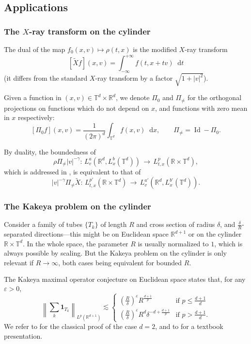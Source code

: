 \documentclass[11pt,a4paper,reqno]{amsart}
\theoremstyle{plain}
\theoremstyle{remark}
\newcommand{\dd}{\mathop{}\!\mathrm{d}}
\begin{document}
\subsection{Applications}

\subsubsection{The $X$-ray transform on the cylinder} The dual of the map $f_0(x,v) \mapsto \rho(t,x)$ is the modified $X$-ray transform
\[
    [\widetilde{X} f](x,v) = \int_{-\infty}^{+ \infty} f(t,x+tv) \dd t
\]
(it differs from the standard $X$-ray transform by a factor $\sqrt{1+|v|^2}$).

Given a function in $(x,v) \in \mathbb{T}^d \times \mathbb{R}^d$, we denote $\Pi_0$ and $\Pi_{\neq}$ for the orthogonal projections on functions which do not depend on $x$, and functions with zero mean in $x$ respectively:
\[
    [\Pi_0 f](x,v) = \frac 1 {(2\pi)^d} \int_{\mathbb{T}^d} f(x,v) \dd x, \qquad \Pi_{\neq} = \operatorname{Id} - \Pi_0.
\]

By duality, the boundedness of
\[
    \rho \Pi_{\neq} |v|^{-\gamma}:\, L_v^a (\mathbb{R}^d, L^b_x(\mathbb{T}^d)) \, \longrightarrow \, L^p_{t,x}(\mathbb{R} \times \mathbb{T}^{d}),
\]
which is addressed in , is equivalent to that of
\[
    |v|^{-\gamma} \Pi_{\neq} \widetilde{X} : \, L^{p'}_{t,x}(\mathbb{R} \times \mathbb{T}^{d}) \, \longrightarrow \, L_v^{a'} (\mathbb{R}^d, L^{b'}_x(\mathbb{T}^d)).
\]
\subsubsection{The Kakeya problem on the cylinder} 
Consider a family of tubes $\{ T_k \}$ of length $R$ and cross section of radius $\delta$, and $\frac{\delta}{R}$-separated directions---this might be on Euclidean space $\mathbb{R}^{d+1}$ or on the cylinder $\mathbb{R} \times \mathbb{T}^d$. 
In the whole space, the parameter $R$ is usually normalized to $1$, which is always possible by scaling. But the Kakeya problem on the cylinder is only relevant if $R \to \infty$, both cases being equivalent for bounded $R$.

The Kakeya maximal operator conjecture on Euclidean space states that, for any $\varepsilon>0$,
\begin{equation}
\label{KMO}
    \left\| \sum_k \mathbf{1}_{T_k} \right\|_{L^p(\mathbb{R}^{d+1})} \lesssim 
    \begin{cases}
        \left( \frac{R}{\delta} \right)^\varepsilon R^{\frac{d+1}p} & \mbox{if $p \leq \frac{d+1}{d}$} \\
        \left( \frac{R}{\delta} \right)^\varepsilon R^d \delta^{-d + \frac{d+1}{p}} & \mbox{if $p > \frac{d+1}{d}$} .
    \end{cases}
\end{equation}
We refer to \cite{Cordoba} for the classical proof of the case $d=2$, and to \cite{Mattila} for a textbook presentation.
\end{document}
